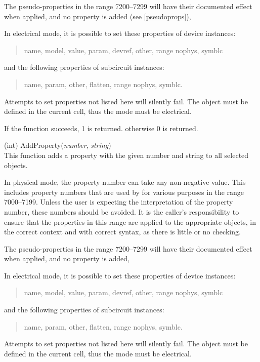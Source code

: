 \begin{description}
The pseudo-properties in the range 7200--7299 will have their
documented effect when applied, and no property is added (see
\ref{pseudoprops}),

In electrical mode, it is possible to set these properties of
device instances:
\begin{quote}
{\et name}, {\et model}, {\et value}, {\et param}, {\et devref},
{\et other}, {\et range} {\et nophys}, {\et symblc}
\end{quote}
and the following properties of subcircuit instances:
\begin{quote}
{\et name}, {\et param}, {\et other}, {\et flatten},
{\et range} {\et nophys}, {\et symblc}.
\end{quote}
Attempts to set properties not listed here will silently fail.  The
object must be defined in the current cell, thus the mode must be
electrical.

If the function succeeds, 1 is returned.  otherwise 0 is returned.

\item{(int) \vt AddProperty({\it number}, {\it string})}\\
This function adds a property with the given number and string to all
selected objects.

In physical mode, the property number can take any non-negative value. 
This includes property numbers that are used by {\Xic} for various
purposes in the range 7000--7199.  Unless the user is expecting the
{\Xic} interpretation of the property number, these numbers should be
avoided.  It is the caller's responsibility to ensure that the
properties in this range are applied to the appropriate objects, in
the correct context and with correct syntax, as there is little or no
checking.

The pseudo-properties in the range 7200--7299 will have their
documented effect when applied, and no property is added,

In electrical mode, it is possible to set these properties of
device instances:
\begin{quote}
{\et name}, {\et model}, {\et value}, {\et param}, {\et devref},
{\et other}, {\et range} {\et nophys}, {\et symblc}
\end{quote}
and the following properties of subcircuit instances:
\begin{quote}
{\et name}, {\et param}, {\et other}, {\et flatten},
{\et range} {\et nophys}, {\et symblc}.
\end{quote}
Attempts to set properties not listed here will silently fail.  The
object must be defined in the current cell, thus the mode must be
electrical.


\end{description}
